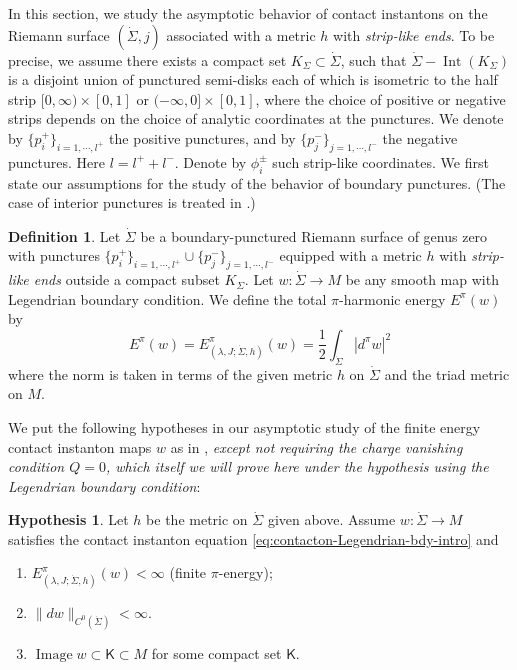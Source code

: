 \documentclass[reqno]{amsart}
\newcommand{\be}{\begin{equation}}
\newcommand{\ee}{\end{equation}}
\theoremstyle{theorem}
\theoremstyle{definition}
\newtheorem{defn}[thm]{Definition}
\newtheorem{hypo}[thm]{Hypothesis}
\numberwithin{equation}{section}
\def\Image{\operatorname{Image}}
\def\Int{\operatorname{Int}}
\begin{document}
In this section, we study the asymptotic behavior of contact instantons
on the Riemann surface $(\dot\Sigma, j)$ associated with a metric $h$ with \emph{strip-like ends}.
To be precise, we assume there exists a compact set $K_\Sigma\subset \dot\Sigma$,
such that $\dot\Sigma-\Int(K_\Sigma)$ is a disjoint union of punctured semi-disks
 each of which is isometric to the half strip $[0, \infty)\times [0,1]$ or $(-\infty, 0]\times [0,1]$, where
the choice of positive or negative strips depends on the choice of analytic coordinates
at the punctures.
We denote by $\{p^+_i\}_{i=1, \cdots, l^+}$ the positive punctures, and by $\{p^-_j\}_{j=1, \cdots, l^-}$ the negative punctures.
Here $l=l^++l^-$. Denote by $\phi^{\pm}_i$ such strip-like coordinates.
We first state our assumptions for the study of the behavior of boundary punctures.
(The case of interior punctures is treated in \cite[Section 6]{oh-wang:CR-map1}.)

\begin{defn}Let $\dot\Sigma$ be a boundary-punctured Riemann surface of genus zero with punctures
$\{p^+_i\}_{i=1, \cdots, l^+}\cup \{p^-_j\}_{j=1, \cdots, l^-}$ equipped
with a metric $h$ with \emph{strip-like ends} outside a compact subset $K_\Sigma$.
Let
$w: \dot \Sigma \to M$ be any smooth map with Legendrian boundary condition.
We define the total $\pi$-harmonic energy $E^\pi(w)$
by
\be\label{eq:endenergy}
E^\pi(w) = E^\pi_{(\lambda,J;\dot\Sigma,h)}(w) = \frac{1}{2} \int_{\dot \Sigma} |d^\pi w|^2
\ee
where the norm is taken in terms of the given metric $h$ on $\dot \Sigma$ and the triad metric on $M$.
\end{defn}

We put the following hypotheses in our asymptotic study of the finite
energy contact instanton maps $w$ as in \cite{oh-wang:CR-map1}, \emph{except not requiring the charge vanishing
condition $Q = 0$, which itself we will prove here under the hypothesis using the Legendrian boundary condition}:

\begin{hypo}\label{hypo:basic}
Let $h$ be the metric on $\dot \Sigma$ given above.
Assume $w:\dot\Sigma\to M$ satisfies the contact instanton equation \eqref{eq:contacton-Legendrian-bdy-intro}
and
\begin{enumerate}
\item $E^\pi_{(\lambda,J;\dot\Sigma,h)}(w)<\infty$ (finite $\pi$-energy);
\item $\|d w\|_{C^0(\dot\Sigma)} <\infty$.
\item $\Image w \subset \mathsf K \subset M$ for some compact set $\mathsf K$.
\end{enumerate}
\end{hypo}
\end{document}
